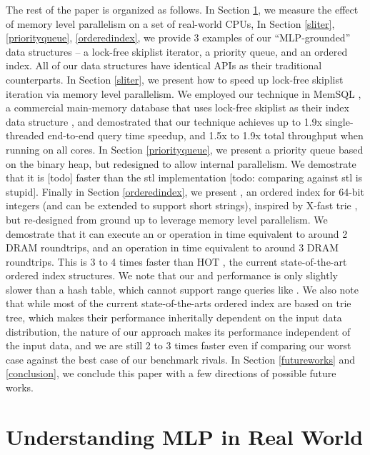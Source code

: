 \documentclass[11pt, usletter]{article}
\begin{document}
The rest of the paper is organized as follows. 
In Section \ref{understandmlp}, we measure the effect of memory level parallelism on a set of real-world CPUs, 
In Section \ref{sliter}, \ref{priorityqueue}, \ref{orderedindex}, 
we provide 3 examples of our ``MLP-grounded'' data structures -- a lock-free skiplist iterator, 
a priority queue, and an ordered index. All of our data structures have identical APIs as their traditional counterparts.
In Section \ref{sliter}, we present how to speed up lock-free skiplist iteration via memory level parallelism. 
We employed our technique in MemSQL \cite{memsql},
a commercial main-memory database that uses lock-free skiplist \cite{lockfree_skiplist} as their index data structure \cite{memsqladamblog}, 
and demostrated that our technique achieves up to 1.9x single-threaded end-to-end query time speedup, and 1.5x to 1.9x
total throughput when running on all cores.
In Section \ref{priorityqueue}, we present a priority queue based on the binary heap, 
but redesigned to allow internal parallelism. We demostrate that it is [todo] faster than the stl implementation 
[todo: comparing against stl is stupid]. 
Finally in Section \ref{orderedindex}, we present \MlpIndex, an ordered index for 64-bit integers 
(and can be extended to support short strings), 
inspired by X-fast trie \cite{xfast}, but re-designed from ground up to leverage memory level parallelism. 
We demostrate that it can execute an \insertion or \lookup operation in time equivalent to around 2 DRAM roundtrips, 
and an \lowerbound operation in time equivalent to around 3 DRAM roundtrips. 
This is 3 to 4 times faster than HOT \cite{hot_sigmod18}, the current state-of-the-art ordered index structures. 
We note that our \insertion and \lookup performance is only slightly slower than a hash table, 
which cannot support range queries like \lowerbound.
We also note that while most of the current state-of-the-arts ordered index are based on trie tree, 
which makes their performance inheritally dependent on the input data distribution, 
the nature of our approach makes its performance independent of the input data, 
and we are still 2 to 3 times faster even if comparing our worst case against the best case of our benchmark rivals.
In Section \ref{futureworks} and \ref{conclusion}, we conclude this paper with a few directions of possible future works.

\section{Understanding MLP in Real World} \label{understandmlp}
\end{document}
